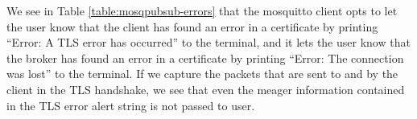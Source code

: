 \documentclass[12pt]{article}
\begin{document}
We see in Table \ref{table:mosqpubsub-errors} that the mosquitto client opts to let the user know that the client has found an error in a certificate by printing ``Error: A TLS error has occurred'' to the terminal, and it lets the user know that the broker has found an error in a certificate by printing ``Error: The connection was lost'' to the terminal. If we capture the packets that are sent to and by the client in the TLS handshake, we see that even the meager information contained in the TLS error alert string is not passed to user. \par

\begin{table}[hbtp]
\centering
\caption{Error Messages Generated by mosquitto\_pub \& mosquitto\_sub Due to Certificate Errors\label{table:mosqpubsub-errors}}
\end{table}
\end{document}
